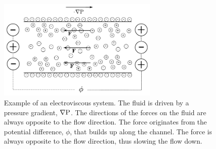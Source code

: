 \begin{figure}
\begin{center}
\includegraphics[width=0.7\textwidth]{fig/channel_electroviscous.pdf}
\end{center}
\caption{Example of an electroviscous system. The fluid is driven by a
  pressure gradient, $\nabla \mathrm{P}$. The directions of the forces on
  the fluid are always opposite to the flow direction. The force
  originates from the potential difference, $\phi$, that builds up
  along the channel. The force is always opposite to the flow
  direction, thus slowing the flow down.}
\label{fig:et:ev}
\end{figure}
